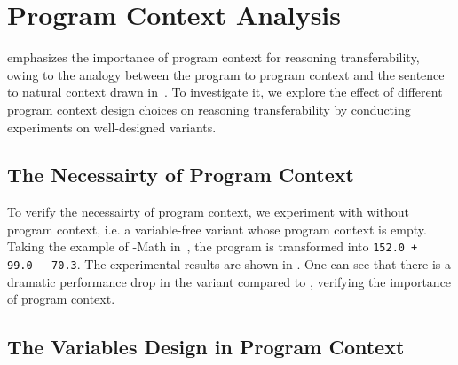 \section{Program Context Analysis}\label{sec:append_var}

\ours emphasizes the importance of program context for reasoning transferability, owing to the analogy between the program to program context and the sentence to natural context drawn in~.
To investigate it, we explore the effect of different program context design choices on reasoning transferability by conducting experiments on well-designed \oursmath variants.

\subsection{The Necessairty of Program Context}

\begin{table}[tbp]
  \small
  \centering
  \caption{The DROP performance with different numbers of irrelevant variables in \oursbartmath pre-training.}
  \label{tab:irr}\end{table}

To verify the necessairty of program context, we experiment with \oursmath without program context, i.e. a variable-free \oursmath variant whose program context is empty.
Taking the example of \ours-Math in~, the program is transformed into \texttt{\small 152.0\,+\,99.0\,-\,70.3}.
The experimental results are shown in .
One can see that there is a dramatic performance drop in the variant compared to \oursmath, verifying the importance of program context.

\subsection{The Variables Design in Program Context}


